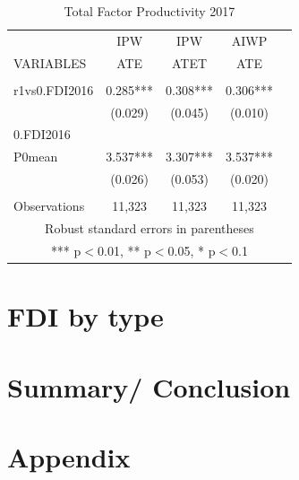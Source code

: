 \documentclass[a4paper,11pt]{scrartcl}
\newcommand{\sectionnumbering}[1]{%
  \setcounter{section}{0}%
   \renewcommand{\thesection}{\csname #1\endcsname{section}}}
\begin{document}
\begin{table}[htbp]\centering
\caption{Total Factor Productivity 2017}
\begin{tabular}{lcccc} \hline
 & IPW  & IPW & AIWP \\
VARIABLES & ATE  & ATET  & ATE & \\ \hline
 &  &  &  \\
r1vs0.FDI2016 & 0.285***  & 0.308*** &   0.306***   \\
 \bigskip
 & (0.029)  & (0.045)  & (0.010)   \\

 
0.FDI2016  &   &    &  \\

P0mean &3.537***  &   3.307*** & 3.537***  \\

 &   (0.026) & (0.053) & (0.020) \\
 &  &  &    \\
 Observations & 11,323 & 11,323 & 11,323  \\ \hline
\multicolumn{7}{c}{ Robust standard errors in parentheses} \\
\multicolumn{7}{c}{ *** p$<$0.01, ** p$<$0.05, * p$<$0.1} \\
\end{tabular}
\end{table}

\newpage
\section{FDI by type}

\section{Summary/ Conclusion}




\newpage






\section*{Appendix}
\sectionnumbering{Roman}
\setcounter{page}{3} %
\end{document}
